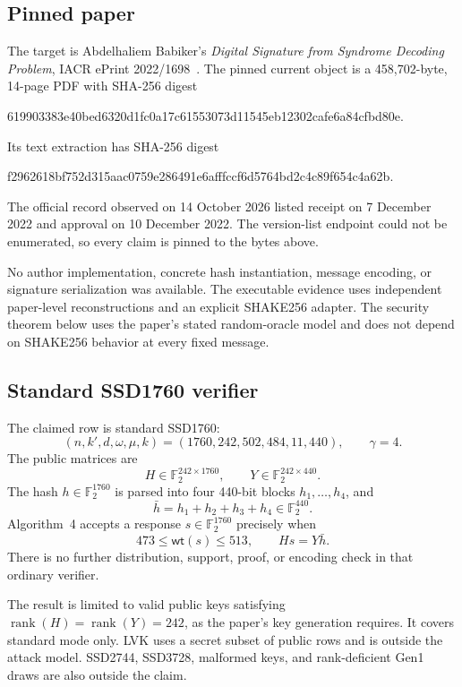 \documentclass[10pt,a4paper]{article}
\newcommand{\F}{\mathbb{F}}
\newcommand{\wt}{\mathsf{wt}}
\begin{document}
\subsection{Pinned paper}

The target is Abdelhaliem Babiker's \emph{Digital Signature from Syndrome
Decoding Problem}, IACR ePrint 2022/1698~\cite{ssd}. The pinned current object
is a 458,702-byte, 14-page PDF with SHA-256 digest
\begin{center}
\small\ttfamily
619903383e40bed6320d1fc0a17c61553073d11545eb12302cafe6a84cfbd80e.
\end{center}
Its text extraction has SHA-256 digest
\begin{center}
\small\ttfamily
f2962618bf752d315aac0759e286491e6afffccf6d5764bd2c4c89f654c4a62b.
\end{center}
The official record observed on 14 October 2026 listed receipt on 7 December
2022 and approval on 10 December 2022. The version-list endpoint could not be
enumerated, so every claim is pinned to the bytes above.

No author implementation, concrete hash instantiation, message encoding, or
signature serialization was available. The executable evidence uses
independent paper-level reconstructions and an explicit SHAKE256 adapter. The
security theorem below uses the paper's stated random-oracle model and does
not depend on SHAKE256 behavior at every fixed message.

\subsection{Standard SSD1760 verifier}

The claimed row is standard SSD1760:
\[
 (n,k',d,\omega,\mu,k)=(1760,242,502,484,11,440),
 \qquad \gamma=4.
\]
The public matrices are
\[
 H\in\F_2^{242\times1760},
 \qquad
 Y\in\F_2^{242\times440}.
\]
The hash $h\in\F_2^{1760}$ is parsed into four 440-bit blocks
$h_1,\ldots,h_4$, and
\[
 \bar h=h_1+h_2+h_3+h_4\in\F_2^{440}.
\]
Algorithm~4 accepts a response $s\in\F_2^{1760}$ precisely when
\begin{equation}
 473\leq\wt(s)\leq513,
 \qquad Hs=Y\bar h.
 \label{eq:verify}
\end{equation}
There is no further distribution, support, proof, or encoding check in that
ordinary verifier.

The result is limited to valid public keys satisfying
$\operatorname{rank}(H)=\operatorname{rank}(Y)=242$, as the paper's key
generation requires. It covers standard mode only. LVK uses a secret subset
of public rows and is outside the attack model. SSD2744, SSD3728, malformed
keys, and rank-deficient Gen1 draws are also outside the claim.
\end{document}
